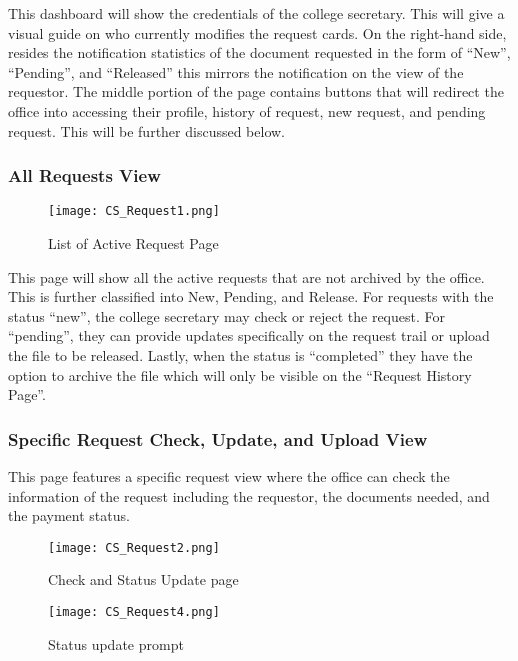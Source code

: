 This dashboard will show the credentials of the college secretary. This will give a visual guide on who currently modifies the request cards. On the right-hand side, resides the notification statistics of the document requested in the form of “New”, “Pending”, and “Released” this mirrors the notification on the view of the requestor. The middle portion of the page contains buttons that will redirect the office into accessing their profile, history of request, new request, and pending request. This will be further discussed below.

\subsubsection{All Requests View}

\begin{figure}[h]
    \centering 
    \begin{minipage}[c]{0.5\linewidth}
        \centering
        \texttt{[image: CS\_Request1.png]}
        \caption{List of Active Request Page}
        \label{fig:CS_Request1}
    \end{minipage}
\end{figure}

This page will show all the active requests that are not archived by the office. This is further classified into New, Pending, and Release. For requests with the status “new”, the college secretary may check or reject the request. For “pending”, they can provide updates specifically on the request trail or upload the file to be released. Lastly, when the status is “completed”  they have the option to archive the file which will only be visible on the “Request History Page”.

\subsubsection{Specific Request Check, Update, and Upload View}

This page features a specific request view where the office can check the information of the request including the requestor, the documents needed, and the payment status.


\begin{figure}[h]
    \centering 
    \begin{minipage}[c]{0.5\linewidth}
        \centering
        \texttt{[image: CS\_Request2.png]}
        \caption{Check and Status Update page}
        \label{fig:CS_Request2}
    \end{minipage}\hfill
    \begin{minipage}[c]{0.5\linewidth}
        \centering
        \texttt{[image: CS\_Request4.png]}
        \caption{Status update prompt}
        \label{fig:CS_Request4}
    \end{minipage}
\end{figure}

